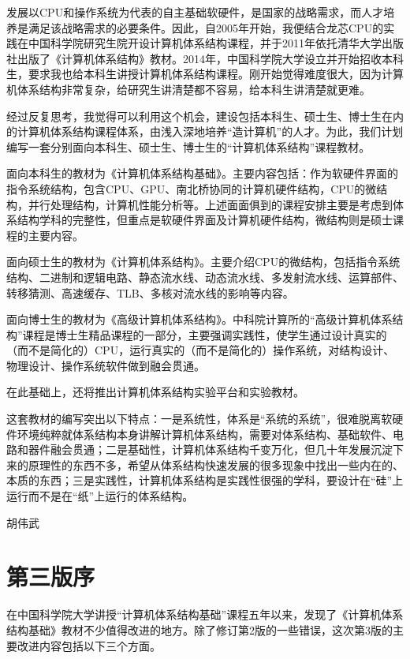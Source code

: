 \documentclass[]{ctexbook}
\begin{document}
发展以CPU和操作系统为代表的自主基础软硬件，是国家的战略需求，而人才培养是满足该战略需求的必要条件。因此，自2005年开始，我便结合龙芯CPU的实践在中国科学院研究生院开设计算机体系结构课程，并于2011年依托清华大学出版社出版了《计算机体系结构》教材。2014年，中国科学院大学设立并开始招收本科生，要求我也给本科生讲授计算机体系结构课程。刚开始觉得难度很大，因为计算机体系结构非常复杂，给研究生讲清楚都不容易，给本科生讲清楚就更难。

经过反复思考，我觉得可以利用这个机会，建设包括本科生、硕士生、博士生在内的计算机体系结构课程体系，由浅入深地培养``造计算机''的人才。为此，我们计划编写一套分别面向本科生、硕士生、博士生的``计算机体系结构''课程教材。

面向本科生的教材为《计算机体系结构基础》。主要内容包括：作为软硬件界面的指令系统结构，包含CPU、GPU、南北桥协同的计算机硬件结构，CPU的微结构，并行处理结构，计算机性能分析等。上述面面俱到的课程安排主要是考虑到体系结构学科的完整性，但重点是软硬件界面及计算机硬件结构，微结构则是硕士课程的主要内容。

面向硕士生的教材为《计算机体系结构》。主要介绍CPU的微结构，包括指令系统结构、二进制和逻辑电路、静态流水线、动态流水线、多发射流水线、运算部件、转移猜测、高速缓存、TLB、多核对流水线的影响等内容。

面向博士生的教材为《高级计算机体系结构》。中科院计算所的``高级计算机体系结构''课程是博士生精品课程的一部分，主要强调实践性，使学生通过设计真实的（而不是简化的）CPU，运行真实的（而不是简化的）操作系统，对结构设计、物理设计、操作系统软件做到融会贯通。

在此基础上，还将推出计算机体系结构实验平台和实验教材。

这套教材的编写突出以下特点：一是系统性，体系是``系统的系统''，很难脱离软硬件环境纯粹就体系结构本身讲解计算机体系结构，需要对体系结构、基础软件、电路和器件融会贯通；二是基础性，计算机体系结构千变万化，但几十年发展沉淀下来的原理性的东西不多，希望从体系结构快速发展的很多现象中找出一些内在的、本质的东西；三是实践性，计算机体系结构是实践性很强的学科，要设计在``硅''上运行而不是在``纸''上运行的体系结构。

胡伟武

\newpage

\hypertarget{ux7b2cux4e09ux7248ux5e8f}{%
\chapter*{第三版序}\label{ux7b2cux4e09ux7248ux5e8f}}



在中国科学院大学讲授``计算机体系结构基础''课程五年以来，发现了《计算机体系结构基础》教材不少值得改进的地方。除了修订第2版的一些错误，这次第3版的主要改进内容包括以下三个方面。
\end{document}

